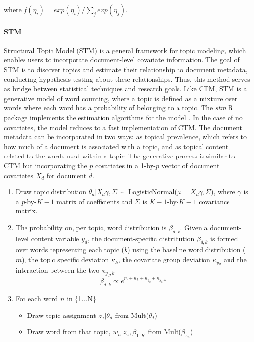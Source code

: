 \documentclass[onecolumn]{article}
\begin{document}
where $f(\eta_i) = exp(\eta_i)/\sum_j exp(\eta_j)$.  


\paragraph*{STM}

Structural Topic Model (STM) is a general framework for topic modeling, which enables users to incorporate document-level covariate information. The goal of STM is to discover topics and estimate their relationship to document metadata, conducting hypothesis testing about these relationships. Thus, this method serves as bridge between statistical techniques and research goals. Like CTM, STM is a generative model of word counting, where a topic is defined as a mixture over words where each word has a probability of belonging to a topic. The \textit{stm} R package implements the estimation algorithms for the model \cite{stm}.  In the case of no covariates, the model reduces to a fast implementation of CTM. The document metadata can be incorporated in two ways: as topical prevalence, which refers to how much of a document is associated with a topic, and as topical content, related to the words used within a topic. The generative process is similar to CTM but incorporating the $p$ covariates in a 1-by-$p$ vector of document covariates $X_d$ for document $d$. 

\begin{enumerate}
    \item Draw topic distribution $\theta_d | X_d \gamma, \Sigma  \sim$ LogisticNormal($\mu = X_d \gamma, \Sigma$), where $\gamma$ is a $p$-by-$K-1$ matrix of coefficients and $\Sigma$ is $K-1$-by-$K-1$ covariance matrix.
    \item The probability on, per topic, word distribution is $\beta_{d,k}$. Given a document-level content variable $y_d$, the document-specific distribution $\beta_{d,k}$ is formed over words representing each topic ($k$) using the baseline word distribution ($m$), the topic specific deviation $\kappa_k$, the covariate group deviation $\kappa_{y_d}$ and the interaction between the two $\kappa_{y_d,k}$
    \begin{equation}
        \beta_{d,k} \propto e^{m + \kappa_k + \kappa_{y_d} + \kappa_{y_d,k} }
    \end{equation}
    \item  For each word $n$ in \{1...N\}
    \begin{itemize}
        \item Draw topic assignment $z_n | \theta_d $ from Mult($\theta_d$) 
        \item Draw word from that topic, $w_n |  z_n,\beta_{1:K} $ from Mult($\beta_{z_n}$)
    \end{itemize}
\end{enumerate}
    
\end{document}
